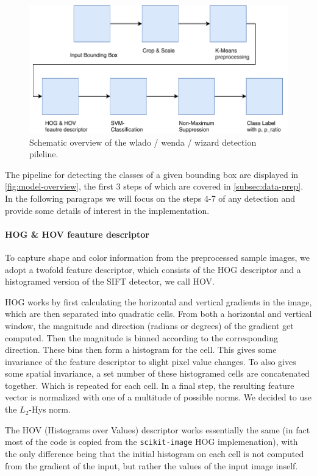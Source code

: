 \documentclass[11pt]{article}
\begin{document}
\begin{figure}
    \centering
    \includegraphics[width=0.9\linewidth]{figures/model_overview} 
    \caption{Schematic overview of the wlado / wenda / wizard detection pileline.}
    \label{fig:model-overview}
\end{figure}

The pipeline for detecting the classes of a given bounding box are displayed in \autoref{fig:model-overview},
the first 3 steps of which are covered in \autoref{subsec:data-prep}. In the following paragraps we will focus on the
steps 4-7 of any detection and provide some details of interest in the implementation.

\paragraph{HOG \& HOV feauture descriptor}
To capture shape and color information from the preprocessed sample images, we adopt a twofold feature descriptor, 
which consists of the HOG descriptor and a histogramed version of the SIFT detector, we call HOV.

HOG works by first calculating the horizontal and vertical gradients in the image, which are then separated into
quadratic cells. From both a horizontal and vertical window, the magnitude and direction (radians or degrees) of the gradient get computed.
Then the magnitude is binned according to the corresponding direction. These bins then form a histogram for the cell.
This gives some invariance of the feature descriptor to slight pixel value changes. 
To also gives some spatial invariance, a set number of these histogramed cells are concatenated together. Which is repeated for each cell.
In a final step, the resulting feature vector is normalized with one of a multitude of possible norms. We decided to use the \( L_2 \)-Hys norm.

The HOV (Histograms over Values) descriptor works essentially the same (in fact most of the code is copied from the \verb|scikit-image| HOG implemenation),
with the only difference being that the initial histogram on each cell is not computed from the gradient of the input,
but rather the values of the input image inself.
\end{document}
